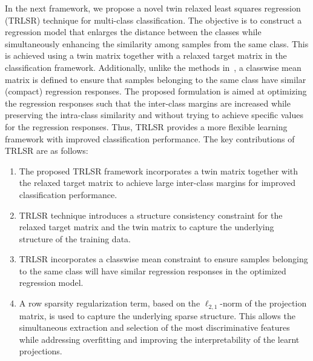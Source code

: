 In the next framework, we propose a novel twin relaxed least squares regression (TRLSR) technique for multi-class classification. The objective is to construct a regression model that enlarges the distance between the classes while simultaneously enhancing the similarity among samples from the same class. This is achieved using a twin matrix together with a relaxed target matrix in the classification framework. Additionally, unlike the methods in~\cite{DLSR,ReLSR}, a classwise mean matrix is defined to ensure that samples belonging to the same class have similar (compact) regression responses. The proposed formulation is aimed at optimizing the regression responses such that the inter-class margins are increased while preserving the intra-class similarity and without trying to achieve specific values for the regression responses. Thus, TRLSR provides a more flexible learning framework with improved classification performance. The key contributions of TRLSR are as follows:
%
\begin{enumerate}
%
\item The proposed TRLSR framework incorporates a twin matrix together with the relaxed target matrix to achieve large inter-class margins for improved classification performance.
%
\item TRLSR technique introduces a structure consistency constraint for the relaxed target matrix and the twin matrix to capture the underlying structure of the training data.
%
\item TRLSR incorporates a classwise mean constraint to ensure samples belonging to the same class will have similar regression responses in the optimized regression model.
%
\item A row sparsity regularization term, based on the $\ell_{2,1}$-norm of the projection matrix, is used to capture the underlying sparse structure. This allows the simultaneous extraction and selection of the most discriminative features while addressing overfitting and improving the interpretability of the learnt projections. 
%
\end{enumerate}
%
